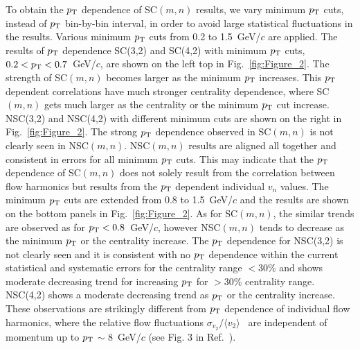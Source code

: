 To obtain the $p_{\rm T}$ dependence of SC$(m,n)$ results, we vary minimum $p_{\rm T}$ cuts, instead of $p_{\rm T}$ bin-by-bin interval, in order to avoid large statistical fluctuations in the results. Various minimum $p_{\rm T}$ cuts from 0.2 to 1.5~GeV/$c$ are applied.
The results of $p_{\rm T}$ dependence SC(3,2) and SC(4,2) with minimum $p_{\rm T}$ cuts, $0.2<p_{\rm T}<0.7$~GeV/$c$, are shown on the left top in Fig.~\ref{fig:Figure_2}.
The strength of SC$(m,n)$ becomes larger as the minimum $p_{\rm T}$ increases. 
This $p_{\rm T}$ dependent correlations have much stronger centrality dependence, where SC$(m,n)$ gets much larger as the centrality or the minimum $p_{\rm T}$ cut increase. 
NSC(3,2) and NSC(4,2) with different minimum cuts are shown on the right in Fig.~\ref{fig:Figure_2}.
The strong $p_{\rm T}$ dependence observed in SC$(m,n)$ is not clearly seen in NSC$(m,n)$. NSC$(m,n)$ results are aligned all together and consistent in errors for all minimum $p_{\rm T}$ cuts. 
This may indicate that the $p_{\rm T}$ dependence of SC$(m,n)$ does not solely result from the correlation between flow harmonics but results from the $p_{\rm T}$  dependent individual $v_n$ values. 
The minimum $p_{\rm T}$ cuts are extended from 0.8  to 1.5~GeV/$c$ and the results are shown on the bottom panels in Fig.~\ref{fig:Figure_2}.
As for SC$(m,n)$, the similar trends are observed as for $p_{\rm T}<0.8$~GeV/$c$, however NSC$(m,n)$ tends to decrease as the minimum $p_{\rm T}$ or the centrality increase.
The $p_{\rm T}$ dependence for NSC(3,2) is not clearly seen and it is consistent with no $p_{\rm T}$ dependence within the current statistical and systematic errors for the centrality range $<$30\% and shows moderate decreasing trend for increasing $p_{\rm T}$ for $>$30\% centrality range.
NSC(4,2) shows a moderate decreasing trend as $p_{\rm T}$ or the centrality increase. These observations are strikingly different from $p_{\rm T}$ dependence of individual flow harmonics, where the relative flow fluctuations $\sigma_{v_2}/\langle v_{2} \rangle$~\cite{Voloshin:2008dg} are independent of momentum up to $p_{\rm T}$ $\sim$ 8~GeV/$c$ (see Fig. 3 in Ref.~\cite{Abelev:2012di}).

